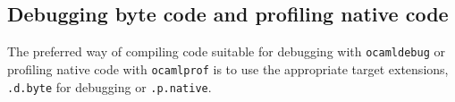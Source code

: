 \documentclass[9pt]{article}
\newcommand{\ocb}{\texttt{ocamlbuild}\xspace}
\newcommand{\tags}{\texttt{\_tags}\xspace}
\begin{document}

\subsection{Debugging byte code and profiling native code}
The preferred way of compiling code suitable for debugging with \texttt{ocamldebug} or
profiling native code with \texttt{ocamlprof} is to use the appropriate target
extensions, \texttt{.d.byte} for debugging or \texttt{.p.native}.
\end{document}
